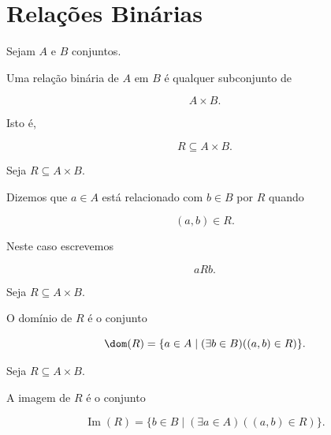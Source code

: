 \documentclass[../../main]{subfiles}
\begin{document}
\section{Relações Binárias}
\label{sec:matematica:relacoes:relacoes-binarias}

\begin{defn}
	\label{def:matematica:relacoes:relacoes-binarias:relacao-binaria}

	Sejam \(A\) e \(B\) conjuntos.

	Uma relação binária de \(A\) em \(B\) é qualquer subconjunto de

	\[
		A \times B.
	\]

	Isto é,

	\[
		R \subseteq A \times B.
	\]

\end{defn}

\begin{defn}
	\label{def:matematica:relacoes:relacoes-binarias:elementos-relacionados}

	Seja \(R\subseteq A\times B\).

	Dizemos que \(a\in A\) está relacionado com \(b\in B\) por \(R\)
	quando

	\[
		(a,b)\in R.
	\]

	Neste caso escrevemos

	\[
		aRb.
	\]

\end{defn}

\begin{defn}
	\label{def:matematica:relacoes:relacoes-binarias:dominio}

	Seja \(R\subseteq A\times B\).

	O domínio de \(R\) é o conjunto

	\[
		\dom(R)
		=
		\{
		a\in A
		\mid
		(\exists b\in B)
		((a,b)\in R)
		\}.
	\]

\end{defn}

\begin{defn}
	\label{def:matematica:relacoes:relacoes-binarias:imagem}

	Seja \(R\subseteq A\times B\).

	A imagem de \(R\) é o conjunto

	\[
		\operatorname{Im}(R)
		=
		\{
		b\in B
		\mid
		(\exists a\in A)
		((a,b)\in R)
		\}.
	\]

\end{defn}
\end{document}
